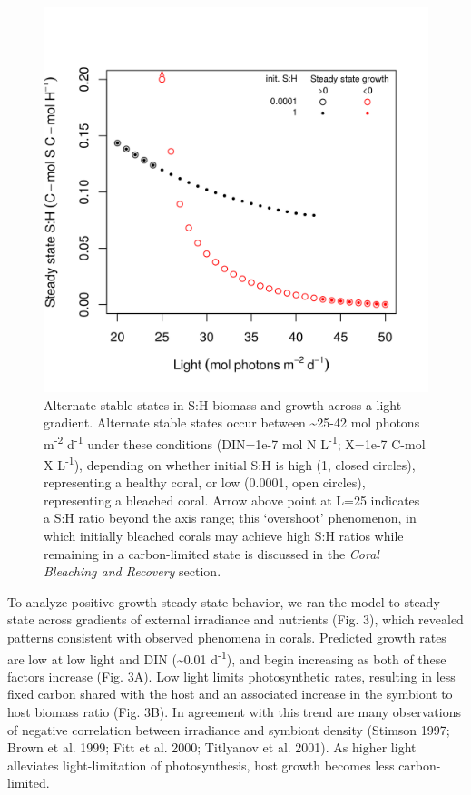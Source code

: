 \documentclass[]{elsarticle} %
\makeatletter
\def\maxwidth{\ifdim\Gin@nat@width>\linewidth\linewidth
\else\Gin@nat@width\fi}
\let\Oldincludegraphics\includegraphics
\renewcommand{\includegraphics}[1]{\Oldincludegraphics[width=\maxwidth]{#1}}
\makeatother
\begin{document}
\begin{figure}[htbp]
\centering
\includegraphics{../img/Fig2.png}
\caption{Alternate stable states in S:H biomass and growth across a
light gradient. Alternate stable states occur between
\textasciitilde{}25-42 mol photons m\textsuperscript{-2}
d\textsuperscript{-1} under these conditions (DIN=1e-7 mol N
L\textsuperscript{-1}; X=1e-7 C-mol X L\textsuperscript{-1}), depending
on whether initial S:H is high (1, closed circles), representing a
healthy coral, or low (0.0001, open circles), representing a bleached
coral. Arrow above point at L=25 indicates a S:H ratio beyond the axis
range; this `overshoot' phenomenon, in which initially bleached corals
may achieve high S:H ratios while remaining in a carbon-limited state is
discussed in the \emph{Coral Bleaching and Recovery} section.}
\end{figure}

To analyze positive-growth steady state behavior, we ran the model to
steady state across gradients of external irradiance and nutrients (Fig.
3), which revealed patterns consistent with observed phenomena in
corals. Predicted growth rates are low at low light and DIN
(\textasciitilde{}0.01 d\textsuperscript{-1}), and begin increasing as
both of these factors increase (Fig. 3A). Low light limits
photosynthetic rates, resulting in less fixed carbon shared with the
host and an associated increase in the symbiont to host biomass ratio
(Fig. 3B). In agreement with this trend are many observations of
negative correlation between irradiance and symbiont density (Stimson
1997; Brown et al. 1999; Fitt et al. 2000; Titlyanov et al. 2001). As
higher light alleviates light-limitation of photosynthesis, host growth
becomes less carbon-limited.
\end{document}
